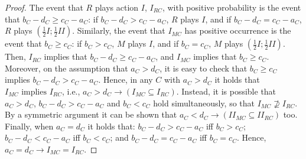 \documentclass[fleqn,reqno,12pt]{article}
\theoremstyle{Satz}
\theoremstyle{Bsp}
\begin{document}
\begin{proof}
The event that $R$ plays action $I$, $I_{RC}$, with positive probability is the event that $b_{C}-d_{C} \geq c_{C}-a_{C}$: if $b_{C}-d_{C}>c_{C}-a_{C}$, $R$ plays $I$, and if $b_{C}-d_{C}=c_{C}-a_{C}$, $R$ plays
  $(\frac{1}{2}I;\frac{1}{2}II)$. Similarly, the event that $I_{MC}$ has positive occurrence is the event that $b_{C} \geq c_{C}$: if $b_{C}>c_{C}$, $M$ plays $I$, and if
  $b_{C}=c_{C}$, $M$ plays $(\frac{1}{2}I;\frac{1}{2}II)$. 
Then, $I_{RC}$ implies that
  $b_{C}-d_{C}\geq c_{C}-a_{C}$, and $I_{MC}$ implies that $b_{C}\geq c_{C}$. Moreover, on the
  assumption that $a_{C}>d_{C}$, it is easy to check that $b_{C}\geq c_{C}$ implies
  $b_{C}-d_{C}>c_{C}-a_{C}$.  Hence, in any $C$ with $a_{C}>d_{C}$ it holds that
  $I_{MC}\mbox{ implies }I_{RC}$, i.e., $a_{C}>d_{C}\rightarrow(I_{MC}\subseteq I_{RC})$.
Instead, it is possible that $a_{C}>d_{C}$, $b_{C}-d_{C}>c_{C}-a_{C}$ and $b_{C}<c_{C}$ hold
  simultaneously, so that $I_{MC}\nsupseteq I_{RC}$.
By a symmetric argument it can be shown that
  $a_{C}<d_{C}\rightarrow(II_{MC}\subseteq II_{RC})$ too. Finally, when $a_{C}=d_{C}$ it holds
  that: $b_{C}-d_{C}>c_{C}-a_{C}$ iff $b_{C}>c_{C}$; $b_{C}-d_{C}<c_{C}-a_{C}$ iff
  $b_{C}<c_{C}$; and $b_{C}-d_{C}=c_{C}-a_{C}$ iff $b_{C}=c_{C}$. Hence,
  $a_{C}=d_{C}\rightarrow I_{MC}=I_{RC}$.
\end{proof}

\vspace{.5cm}
\end{document}
